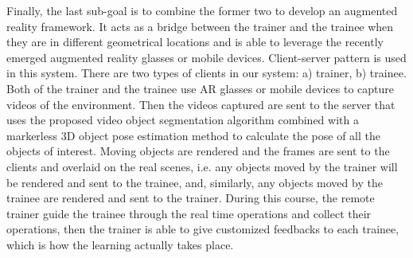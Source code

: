 Finally, the last sub-goal is to combine the former two to develop an augmented reality framework.
It acts as a bridge between the trainer and the trainee when they are in different geometrical locations and is able to leverage the recently emerged augmented reality glasses or mobile devices.
Client-server pattern is used in this system. There are two types of clients in our system: a) trainer, b) trainee.
Both of the trainer and the trainee use AR glasses or mobile devices to capture videos of the environment.
Then the videos captured are sent to the server that uses the proposed video object segmentation algorithm combined with a markerless 3D object pose estimation method to calculate the pose of all the objects of interest.
Moving objects are rendered and the frames are sent to the clients and overlaid on the real scenes, i.e. any objects moved by the trainer will be rendered and sent to the trainee, and, similarly, any objects moved by the trainee are rendered and sent to the trainer.
During this course, the remote trainer guide the trainee through the real time operations and collect their operations, then the trainer is able to give customized feedbacks to each trainee, which is how the learning actually takes place.

\cleardoublepage
